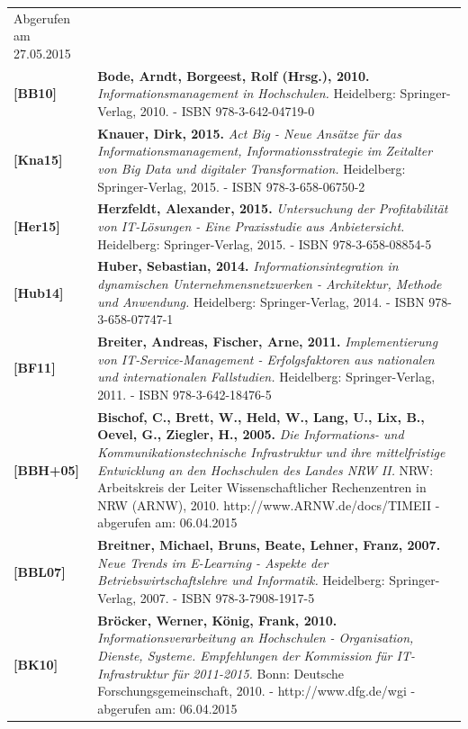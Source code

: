 \documentclass[a4paper]{article}
\newcommand\textstylepissn[1]{#1}
\begin{document}
\begin{flushleft}
\begin{supertabular}{m{1.6999999cm}m{13.269cm}}
{\sffamily Abgerufen am 27.05.2015}\\
{\sffamily\bfseries [BB10]} &
{\sffamily \textbf{Bode, Arndt, Borgeest, Rolf (Hrsg.), 2010. }\textit{Informationsmanagement in Hochschulen.}
Heidelberg: Springer-Verlag, 2010. - ISBN 978-3-642-04719-0}\\
{\sffamily\bfseries [Kna15]} &
{\sffamily \textbf{Knauer, Dirk, 2015. }\textit{Act Big - Neue Ansätze für das Informationsmanagement,
Informationsstrategie im Zeitalter von Big Data und digitaler Transformation. }Heidelberg: Springer-Verlag, 2015. -
ISBN \textstylepissn{978-3-658-06750-2}}\\
{\sffamily\bfseries [Her15]} &
{\sffamily \textbf{Herzfeldt, Alexander, 2015. }\textit{Untersuchung der Profitabilität von IT-Lösungen - Eine
Praxisstudie aus Anbietersicht. }Heidelberg: Springer-Verlag, 2015. - ISBN \textstylepissn{978-3-658-08854-5}}\\
{\sffamily\bfseries [Hub14]} &
{\sffamily \textbf{Huber, Sebastian, 2014. }\textit{Informationsintegration in dynamischen Unternehmensnetzwerken -
Architektur, Methode und Anwendung. }Heidelberg: Springer-Verlag, 2014. - ISBN \textstylepissn{978-3-658-07747-1}}\\
{\sffamily\bfseries [BF11]} &
{\sffamily \textbf{Breiter, Andreas, Fischer, Arne, 2011. }\textit{Implementierung von IT-Service-Management -
Erfolgsfaktoren aus nationalen und internationalen Fallstudien. }Heidelberg: Springer-Verlag, 2011. - ISBN
\textstylepissn{978-3-642-18476-5}}\\
{\sffamily\bfseries [BBH+05]} &
{\sffamily \textbf{Bischof, C., Brett, W., Held, W., Lang, U., Lix, B., Oevel, G., Ziegler, H., 2005. }\textit{Die
Informations- und Kommunikationstechnische Infrastruktur und ihre mittelfristige Entwicklung an den Hochschulen des
Landes NRW II. }NRW: Arbeitskreis der Leiter Wissenschaftlicher Rechenzentren in NRW (ARNW), 2010.\textit{
}http://www.ARNW.de/docs/TIMEII - abgerufen am: 06.04.2015}\\
{\sffamily\bfseries [BBL07]} &
{\sffamily \textbf{Breitner, Michael, Bruns, Beate, Lehner, Franz, 2007. }\textit{Neue Trends im E-Learning - Aspekte
der Betriebswirtschaftslehre und Informatik. }Heidelberg: Springer-Verlag, 2007. - ISBN
\textstylepissn{978-3-7908-1917-5}}\\
{\sffamily\bfseries [BK10]} &
{\sffamily \textbf{Bröcker, Werner, König, Frank, 2010. }\textit{Informationsverarbeitung an Hochschulen - Organisation,
Dienste, Systeme. Empfehlungen der Kommission für IT-Infrastruktur für 2011-2015. }Bonn: Deutsche
Forschungsgemeinschaft, 2010. - http://www.dfg.de/wgi - abgerufen am: 06.04.2015}\\
\end{supertabular}
\end{flushleft}
\end{document}
